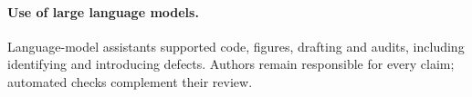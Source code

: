 \paragraph{Use of large language models.}\label{app:llm}
Language-model assistants supported code, figures, drafting and audits,
including identifying and introducing defects. Authors remain responsible
for every claim; automated checks complement their review.
